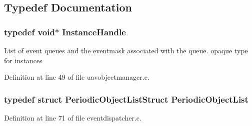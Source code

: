 \subsection{\-Typedef \-Documentation}
\hypertarget{group___u_a_v_object_handling_gabd5387dedf4d32f408b532b19fcdc1da}{
\subsubsection[{\-Instance\-Handle}]{\setlength{\rightskip}{0pt plus 5cm}typedef void$\ast$ {\bf \-Instance\-Handle}}}\label{group___u_a_v_object_handling_gabd5387dedf4d32f408b532b19fcdc1da}
\-List of event queues and the eventmask associated with the queue. opaque type for instances 

\-Definition at line 49 of file uavobjectmanager.\-c.

\hypertarget{group___u_a_v_object_handling_ga3da0c8782a25b0b174e36b9f80d02183}{
\subsubsection[{\-Periodic\-Object\-List}]{\setlength{\rightskip}{0pt plus 5cm}typedef struct {\bf \-Periodic\-Object\-List\-Struct} {\bf \-Periodic\-Object\-List}}}\label{group___u_a_v_object_handling_ga3da0c8782a25b0b174e36b9f80d02183}


\-Definition at line 71 of file eventdispatcher.\-c.



